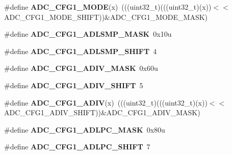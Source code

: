 \begin{DoxyCompactItemize}
\item 
\#define {\bfseries A\+D\+C\+\_\+\+C\+F\+G1\+\_\+\+M\+O\+DE}(x)~(((uint32\+\_\+t)(((uint32\+\_\+t)(x))$<$$<$A\+D\+C\+\_\+\+C\+F\+G1\+\_\+\+M\+O\+D\+E\+\_\+\+S\+H\+I\+FT))\&A\+D\+C\+\_\+\+C\+F\+G1\+\_\+\+M\+O\+D\+E\+\_\+\+M\+A\+SK)\hypertarget{group__ADC__Register__Masks_gabdbbdc3e2263f1d453aac3fef184d997}{}\label{group__ADC__Register__Masks_gabdbbdc3e2263f1d453aac3fef184d997}

\item 
\#define {\bfseries A\+D\+C\+\_\+\+C\+F\+G1\+\_\+\+A\+D\+L\+S\+M\+P\+\_\+\+M\+A\+SK}~0x10u\hypertarget{group__ADC__Register__Masks_ga3f96490246c5bef5f9ccede781423b22}{}\label{group__ADC__Register__Masks_ga3f96490246c5bef5f9ccede781423b22}

\item 
\#define {\bfseries A\+D\+C\+\_\+\+C\+F\+G1\+\_\+\+A\+D\+L\+S\+M\+P\+\_\+\+S\+H\+I\+FT}~4\hypertarget{group__ADC__Register__Masks_gab2cd2b0ee8a3e6c0e3710e5477ba4f25}{}\label{group__ADC__Register__Masks_gab2cd2b0ee8a3e6c0e3710e5477ba4f25}

\item 
\#define {\bfseries A\+D\+C\+\_\+\+C\+F\+G1\+\_\+\+A\+D\+I\+V\+\_\+\+M\+A\+SK}~0x60u\hypertarget{group__ADC__Register__Masks_gaffbe8246d864b7889a3ce04b94e6d948}{}\label{group__ADC__Register__Masks_gaffbe8246d864b7889a3ce04b94e6d948}

\item 
\#define {\bfseries A\+D\+C\+\_\+\+C\+F\+G1\+\_\+\+A\+D\+I\+V\+\_\+\+S\+H\+I\+FT}~5\hypertarget{group__ADC__Register__Masks_gacbe42773bc1f15c2870c2422c89bfe67}{}\label{group__ADC__Register__Masks_gacbe42773bc1f15c2870c2422c89bfe67}

\item 
\#define {\bfseries A\+D\+C\+\_\+\+C\+F\+G1\+\_\+\+A\+D\+IV}(x)~(((uint32\+\_\+t)(((uint32\+\_\+t)(x))$<$$<$A\+D\+C\+\_\+\+C\+F\+G1\+\_\+\+A\+D\+I\+V\+\_\+\+S\+H\+I\+FT))\&A\+D\+C\+\_\+\+C\+F\+G1\+\_\+\+A\+D\+I\+V\+\_\+\+M\+A\+SK)\hypertarget{group__ADC__Register__Masks_ga7407a87e3d32012930901336c97b7694}{}\label{group__ADC__Register__Masks_ga7407a87e3d32012930901336c97b7694}

\item 
\#define {\bfseries A\+D\+C\+\_\+\+C\+F\+G1\+\_\+\+A\+D\+L\+P\+C\+\_\+\+M\+A\+SK}~0x80u\hypertarget{group__ADC__Register__Masks_ga308bdf4f339315924bd36b1f2aa3d254}{}\label{group__ADC__Register__Masks_ga308bdf4f339315924bd36b1f2aa3d254}

\item 
\#define {\bfseries A\+D\+C\+\_\+\+C\+F\+G1\+\_\+\+A\+D\+L\+P\+C\+\_\+\+S\+H\+I\+FT}~7\hypertarget{group__ADC__Register__Masks_ga15e7cf514347ab7f32e2104b1776704e}{}\label{group__ADC__Register__Masks_ga15e7cf514347ab7f32e2104b1776704e}


\end{DoxyCompactItemize}
